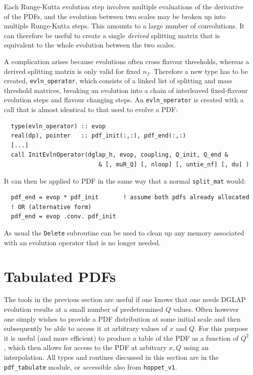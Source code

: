 \documentclass[12pt]{article}
\newcommand{\ttt}[1]{\texttt{#1}}
\begin{document}
Each Runge-Kutta evolution step involves multiple evaluations of the
derivative of the PDFs, and the evolution between two scales may be
broken up into multiple Runge-Kutta steps. This amounts to a large
number of convolutions. It can therefore be useful to create a single
\emph{derived} splitting matrix that is equivalent to the whole
evolution between the two scales. 

A complication arises because evolutions often cross flavour
thresholds, whereas a derived splitting matrix is only valid for fixed
$n_f$. Therefore a new type has to be created, \ttt{evln\_operator},
which consists of a linked list of splitting and mass threshold
matrices, breaking an evolution into a chain of interleaved
fixed-flavour evolution steps and flavour changing steps. An
\ttt{evln\_operator} is created with a call that is almost identical
to that used to evolve a PDF:
\begin{lstlisting}
  type(evln_operator) :: evop
  real(dp), pointer   :: pdf_init(:,:), pdf_end(:,:)
  [...]
  call InitEvlnOperator(dglap_h, evop, coupling, Q_init, Q_end &
                           & [, muR_Q] [, nloop] [, untie_nf] [, du] )
\end{lstlisting}
It can then be applied to PDF in the same way that a normal
\ttt{split\_mat} would:
\begin{lstlisting}
  pdf_end = evop * pdf_init       ! assume both pdfs already allocated
  ! OR (alternative form) 
  pdf_end = evop .conv. pdf_init  
\end{lstlisting}
As usual the \ttt{Delete} subroutine can be used to clean up any
memory associated with an evolution operator that is no longer needed.


\section{Tabulated PDFs}
\label{sec:tabulated-pdfs}

The tools in the previous section are useful if one knows that one
needs DGLAP evolution results at a small number of predetermined $Q$
values. Often however one simply wishes to provide a PDF distribution
at some initial scale and then subsequently be able to access it at
arbitrary values of $x$ and $Q$. For this purpose it is useful 
(and more efficient) to
produce a table of the PDF as a function of $Q^2$, which then allows
for access to the PDF at arbitrary $x, Q$ using an interpolation. All
types and routines discussed in this section are in the
\ttt{pdf\_tabulate} module, or accessible also from \ttt{hoppet\_v1}.
\end{document}
